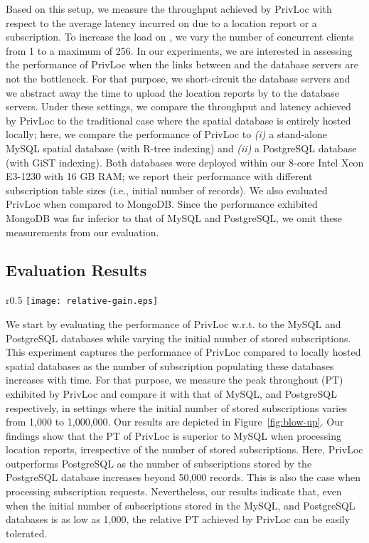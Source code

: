 \documentclass{llncs}
\newcommand\sol{{\sf PrivLoc}}
\begin{document}
Based on this setup, we measure the throughput achieved by \sol{} with respect to the average latency incurred on  due to a location report or a subscription. To increase the load on , we vary the number of concurrent clients from 1 to a maximum of 256. In our experiments, we are interested in assessing the performance of
\sol{} when the links between  and the database servers are not the bottleneck. For that purpose, we short-circuit the database servers and we abstract away the time to upload the location reports by  to the database servers.
Under these settings, we compare the throughput and latency achieved by \sol{} to the traditional case where the spatial database is entirely hosted locally; here, we compare the performance
of \sol{} to \emph{(i)} a stand-alone MySQL spatial database (with R-tree indexing) and \emph{(ii)} a PostgreSQL database (with GiST indexing). Both databases were deployed within our 8-core Intel Xeon E3-1230 with 16 GB RAM; we report their performance with different subscription table sizes (i.e., initial number of records). We also evaluated \sol{}
when compared to MongoDB. Since the performance exhibited MongoDB was far inferior to that of MySQL and PostgreSQL, we omit these measurements from our evaluation.




\subsection{Evaluation Results}

\begin{wrapfigure}{r}{0.5\textwidth}
\vspace{-5 em}
\texttt{[image: relative-gain.eps]}
\vspace{-2 em}
\caption{Comparison between \sol{} and local MySQL and PostgreSQL databases.}
\label{fig:blow-up}
\vspace{-2 em}
\end{wrapfigure}

We start by evaluating the performance of \sol{} w.r.t. to the MySQL and PostgreSQL databases while varying the initial number of stored subscriptions. This experiment captures the performance of \sol{} compared to locally hosted spatial databases as the number of subscription populating these databases increases with time. For that purpose, we measure the peak throughout (PT) exhibited by \sol{} and compare it with that of MySQL, and PostgreSQL respectively, in settings where the initial number of stored subscriptions varies from 1,000 to 1,000,000. Our results are depicted in Figure~\ref{fig:blow-up}. Our findings show that the PT of \sol{} is superior to MySQL when processing location reports, irrespective of the number of stored subscriptions. Here, \sol{} outperforms PostgreSQL as the number of subscriptions stored by the PostgreSQL database increases beyond 50,000 records. This is also the case when processing subscription requests. Nevertheless, our results indicate that, even when the initial number of subscriptions stored in the MySQL, and PostgreSQL databases is as low as 1,000, the relative PT achieved by \sol{} can be easily tolerated.
\end{document}
